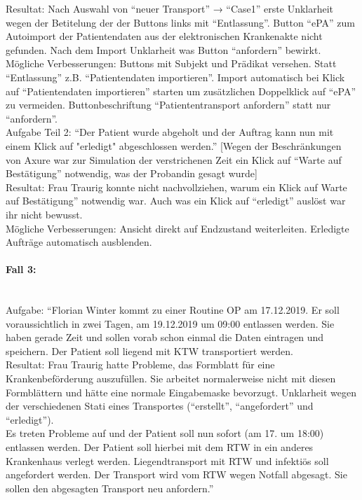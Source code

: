 \documentclass[a4paper, ngerman, 12pt]{scrartcl}
\begin{document}
Resultat: Nach Auswahl von “neuer Transport” → “Case1” erste Unklarheit wegen der Betitelung der der Buttons links mit “Entlassung”. Button “ePA” zum Autoimport der Patientendaten aus der elektronischen Krankenakte nicht gefunden. Nach dem Import Unklarheit was Button “anfordern” bewirkt.\\

Mögliche Verbesserungen: Buttons mit Subjekt und Prädikat versehen. Statt “Entlassung” z.B. “Patientendaten importieren”. Import automatisch bei Klick auf “Patientendaten importieren” starten um zusätzlichen Doppelklick auf “ePA” zu vermeiden. Buttonbeschriftung “Patiententransport  anfordern” statt nur “anfordern”.\\
 
Aufgabe Teil 2: “Der Patient wurde abgeholt und der Auftrag kann nun mit einem Klick auf "erledigt" abgeschlossen werden.”
[Wegen der Beschränkungen von Axure war zur Simulation der verstrichenen Zeit ein Klick auf “Warte auf Bestätigung” notwendig, was der Probandin gesagt wurde]\\
 
Resultat: Frau Traurig konnte nicht nachvollziehen, warum ein Klick auf Warte auf Bestätigung” notwendig war. Auch was ein Klick auf “erledigt” auslöst war ihr nicht bewusst.\\
 
Mögliche Verbesserungen: Ansicht direkt auf Endzustand weiterleiten. Erledigte Aufträge automatisch ausblenden.

\paragraph{Fall 3:}\leavevmode\\
Aufgabe: “Florian Winter kommt zu einer Routine OP am 17.12.2019. Er soll voraussichtlich in zwei Tagen, am 19.12.2019 um 09:00 entlassen werden. Sie haben gerade Zeit und sollen vorab schon einmal die Daten eintragen und speichern. Der Patient soll liegend mit KTW transportiert werden.\\
 
Resultat: Frau Traurig hatte Probleme, das Formblatt für eine Krankenbeförderung auszufüllen. Sie arbeitet normalerweise nicht mit diesen Formblättern und hätte eine normale Eingabemaske bevorzugt. Unklarheit wegen der verschiedenen Stati eines Transportes (“erstellt”, “angefordert” und “erledigt”).\\
 
Es treten Probleme auf und der Patient soll nun sofort (am 17. um 18:00) entlassen werden. Der Patient soll hierbei mit dem RTW in ein anderes Krankenhaus verlegt werden. Liegendtransport mit RTW und infektiös soll angefordert werden. Der Transport wird vom RTW wegen Notfall abgesagt. Sie sollen den abgesagten Transport neu anfordern.”\\
 
\end{document}
